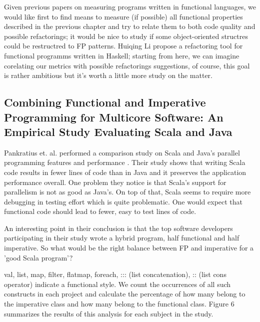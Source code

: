 \documentclass{article}
\begin{document}
Given previous papers on measuring programs written in functional languages, we would like first to find means to measure (if possible) all functional properties described in the previous chapter and try to relate them to both code quality and possible refactorings; it would be nice to study if some object-oriented structres could be restructred to FP patterns. Huiqing Li propose a refactoring tool for functional programms written in Haskell\cite{Li:2003:TSR:871895.871899}; starting from here, we can imagine corelating our metrics with possible refactorings suggestions, of course, this goal is rather ambitious but it's worth a little more study on the matter.

\subsection {Combining Functional and Imperative Programming for Multicore Software: An Empirical Study Evaluating Scala and Java}
Pankratius et. al. performed a comparison study on Scala and Java's parallel programming features and performance \cite{Pankratius_combiningfunctional}. Their study shows that writing Scala code results in fewer lines of code than in Java and it preserves the application performance overall. One problem they notice is that Scala's support for parallelism is not as good as Java's. On top of that, Scala seems to require more debugging in testing effort which is quite problematic. One would expect that functional code should lead to fewer, easy to test lines of code. \par

An interesting point in their conclusion is that the top software developers participating in their study wrote a hybrid program, half functional and half imperative. So what would be the right balance between FP and imperative for a 'good Scala program'? \par

val, list, map, filter, flatmap, foreach, ::: (list concatenation), :: (list cons operator) indicate a functional style. We count the occurrences of all such constructs in each project and calculate the percentage of how many belong to the imperative class and how many belong to the functional class. Figure 6 summarizes the results of this analysis for each subject in the study. \cite{Pankratius_combiningfunctional}
\end{document}
